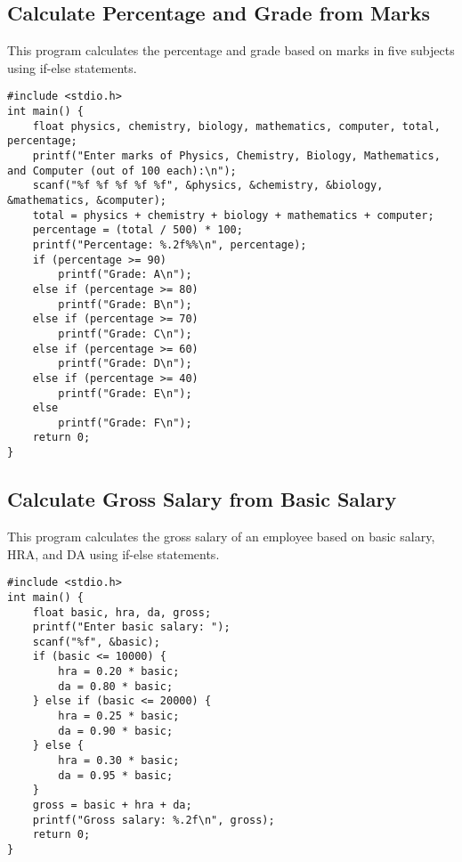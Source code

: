 \documentclass[a4paper,12pt]{article}
\begin{document}
\newpage

\subsection{Calculate Percentage and Grade from Marks}
This program calculates the percentage and grade based on marks in five subjects using if-else statements.

\begin{lstlisting}[caption={Calculate Percentage and Grade from Marks}]
#include <stdio.h>
int main() {
    float physics, chemistry, biology, mathematics, computer, total, percentage;
    printf("Enter marks of Physics, Chemistry, Biology, Mathematics, and Computer (out of 100 each):\n");
    scanf("%f %f %f %f %f", &physics, &chemistry, &biology, &mathematics, &computer);
    total = physics + chemistry + biology + mathematics + computer;
    percentage = (total / 500) * 100;
    printf("Percentage: %.2f%%\n", percentage);
    if (percentage >= 90)
        printf("Grade: A\n");
    else if (percentage >= 80)
        printf("Grade: B\n");
    else if (percentage >= 70)
        printf("Grade: C\n");
    else if (percentage >= 60)
        printf("Grade: D\n");
    else if (percentage >= 40)
        printf("Grade: E\n");
    else
        printf("Grade: F\n");
    return 0;
}
\end{lstlisting}

\newpage

\subsection{Calculate Gross Salary from Basic Salary}
This program calculates the gross salary of an employee based on basic salary, HRA, and DA using if-else statements.

\begin{lstlisting}[caption={Calculate Gross Salary from Basic Salary}]
#include <stdio.h>
int main() {
    float basic, hra, da, gross;
    printf("Enter basic salary: ");
    scanf("%f", &basic);
    if (basic <= 10000) {
        hra = 0.20 * basic;
        da = 0.80 * basic;
    } else if (basic <= 20000) {
        hra = 0.25 * basic;
        da = 0.90 * basic;
    } else {
        hra = 0.30 * basic;
        da = 0.95 * basic;
    }
    gross = basic + hra + da;
    printf("Gross salary: %.2f\n", gross);
    return 0;
}
\end{lstlisting}
\end{document}
